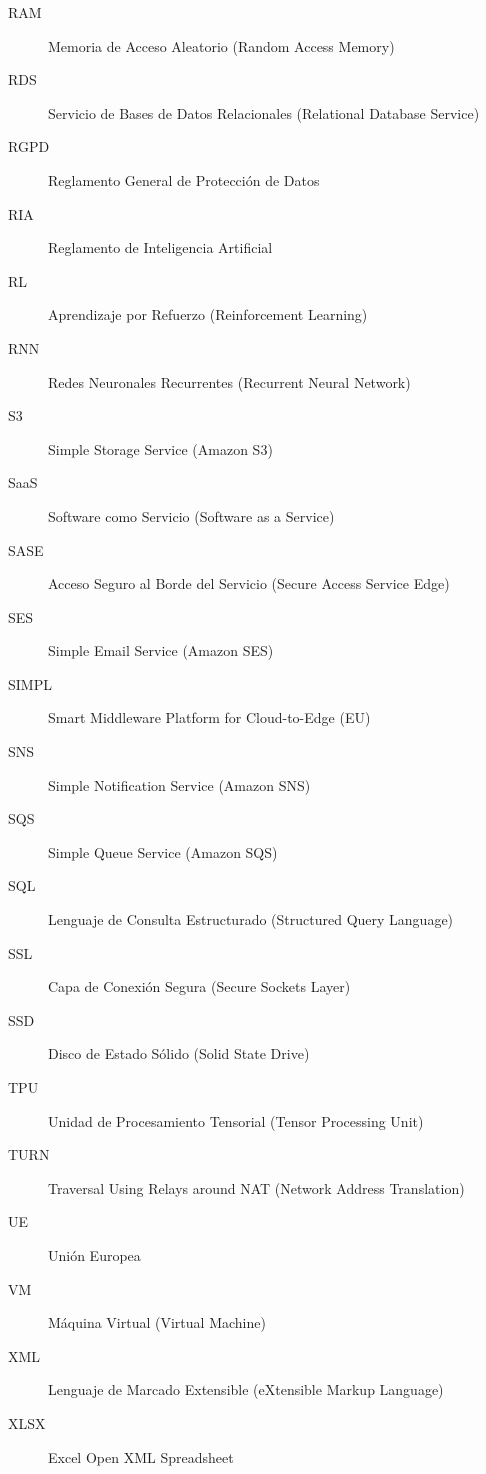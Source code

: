 \begin{description}
	\item[RAM] Memoria de Acceso Aleatorio (Random Access Memory)
	\item[RDS] Servicio de Bases de Datos Relacionales (Relational Database Service)
	\item[RGPD] Reglamento General de Protección de Datos
	\item[RIA] Reglamento de Inteligencia Artificial
	\item[RL] Aprendizaje por Refuerzo (Reinforcement Learning)
	\item[RNN] Redes Neuronales Recurrentes (Recurrent Neural Network)
	\item[S3] Simple Storage Service (Amazon S3)
	\item[SaaS] Software como Servicio (Software as a Service)
	\item[SASE] Acceso Seguro al Borde del Servicio (Secure Access Service Edge)
	\item[SES] Simple Email Service (Amazon SES)
	\item[SIMPL] Smart Middleware Platform for Cloud-to-Edge (EU)
	\item[SNS] Simple Notification Service (Amazon SNS)
	\item[SQS] Simple Queue Service (Amazon SQS)
	\item[SQL] Lenguaje de Consulta Estructurado (Structured Query Language)
	\item[SSL] Capa de Conexión Segura (Secure Sockets Layer)
	\item[SSD] Disco de Estado Sólido (Solid State Drive)
	\item[TPU] Unidad de Procesamiento Tensorial (Tensor Processing Unit)
	\item[TURN] Traversal Using Relays around NAT (Network Address Translation)
	\item[UE] Unión Europea
	\item[VM] Máquina Virtual (Virtual Machine)
	\item[XML] Lenguaje de Marcado Extensible (eXtensible Markup Language)
	\item[XLSX] Excel Open XML Spreadsheet
	
\end{description}


 \newpage
